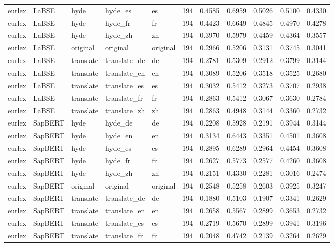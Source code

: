 \begin{tabular}{lllllrrrrrr}
eurlex & LaBSE & hyde & hyde\_es & es & 194 & 0.4585 & 0.6959 & 0.5026 & 0.5100 & 0.4330 \\
eurlex & LaBSE & hyde & hyde\_fr & fr & 194 & 0.4423 & 0.6649 & 0.4845 & 0.4970 & 0.4278 \\
eurlex & LaBSE & hyde & hyde\_zh & zh & 194 & 0.3970 & 0.5979 & 0.4459 & 0.4364 & 0.3557 \\
eurlex & LaBSE & original & original & original & 194 & 0.2966 & 0.5206 & 0.3131 & 0.3745 & 0.3041 \\
eurlex & LaBSE & translate & translate\_de & de & 194 & 0.2781 & 0.5309 & 0.2912 & 0.3799 & 0.3144 \\
eurlex & LaBSE & translate & translate\_en & en & 194 & 0.3089 & 0.5206 & 0.3518 & 0.3525 & 0.2680 \\
eurlex & LaBSE & translate & translate\_es & es & 194 & 0.3032 & 0.5412 & 0.3273 & 0.3707 & 0.2938 \\
eurlex & LaBSE & translate & translate\_fr & fr & 194 & 0.2863 & 0.5412 & 0.3067 & 0.3630 & 0.2784 \\
eurlex & LaBSE & translate & translate\_zh & zh & 194 & 0.2863 & 0.4948 & 0.3144 & 0.3360 & 0.2732 \\
eurlex & SapBERT & hyde & hyde\_de & de & 194 & 0.2208 & 0.5928 & 0.2191 & 0.3944 & 0.3144 \\
eurlex & SapBERT & hyde & hyde\_en & en & 194 & 0.3134 & 0.6443 & 0.3351 & 0.4501 & 0.3608 \\
eurlex & SapBERT & hyde & hyde\_es & es & 194 & 0.2895 & 0.6289 & 0.2964 & 0.4454 & 0.3608 \\
eurlex & SapBERT & hyde & hyde\_fr & fr & 194 & 0.2627 & 0.5773 & 0.2577 & 0.4260 & 0.3608 \\
eurlex & SapBERT & hyde & hyde\_zh & zh & 194 & 0.2151 & 0.4330 & 0.2281 & 0.3016 & 0.2474 \\
eurlex & SapBERT & original & original & original & 194 & 0.2548 & 0.5258 & 0.2603 & 0.3925 & 0.3247 \\
eurlex & SapBERT & translate & translate\_de & de & 194 & 0.1880 & 0.5103 & 0.1907 & 0.3341 & 0.2629 \\
eurlex & SapBERT & translate & translate\_en & en & 194 & 0.2658 & 0.5567 & 0.2899 & 0.3653 & 0.2732 \\
eurlex & SapBERT & translate & translate\_es & es & 194 & 0.2719 & 0.5670 & 0.2899 & 0.3941 & 0.3196 \\
eurlex & SapBERT & translate & translate\_fr & fr & 194 & 0.2048 & 0.4742 & 0.2139 & 0.3264 & 0.2629 \\

\end{tabular}
